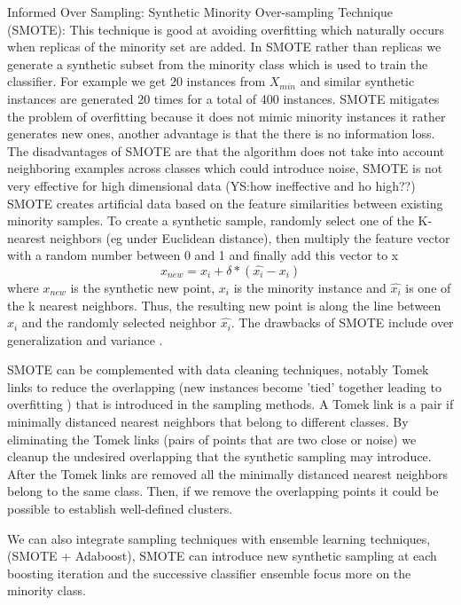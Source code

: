 \documentclass[11pt]{article}
\theoremstyle{definition}
\theoremstyle{remark}
\begin{document}
{Informed Over Sampling: Synthetic Minority Over-sampling Technique (SMOTE): This technique is good at avoiding overfitting which naturally occurs when replicas of the minority set are added. In SMOTE rather than replicas we generate a synthetic subset from the minority class which is used to train the classifier. For example we get 20 instances from $X_{min}$ and similar synthetic instances are generated 20 times for a total of 400 instances. SMOTE mitigates the problem of overfitting because it does not mimic minority instances it rather generates new ones, another advantage is that the there is no information loss.
The disadvantages of SMOTE are that the algorithm does not take into account neighboring examples across classes which could introduce noise, SMOTE is not very effective for high dimensional data (YS:how ineffective and ho high??)
SMOTE creates artificial data based on the feature similarities between existing minority samples. To create a synthetic sample, randomly select one of the K-nearest neighbors (eg under Euclidean distance), then multiply the feature vector with a random number between 0 and 1 and finally add this vector to x
\begin{equation}
x_{new} =  x_i + \delta * (\hat{x_i} - x_i)
\end{equation}
where $x_{new}$ is the synthetic new point, $x_i$ is the minority instance and $\hat{x_i}$ is one of the k nearest neighbors. Thus, the resulting new point is along the line between $x_i$ and the randomly selected neighbor $\hat{x_i}$. The drawbacks of SMOTE include over generalization and variance \cite{wang2004imbalanced}.

SMOTE can be complemented with data cleaning techniques, notably Tomek links \cite{tomek1976two} to reduce the overlapping (new instances become 'tied' together leading to overfitting \cite{mease2007boosted}) that is introduced in the sampling methods.
A Tomek link is a pair if minimally distanced nearest neighbors that belong to different classes. By eliminating the Tomek links (pairs of points that are two close or noise) we cleanup the undesired overlapping that the synthetic sampling may introduce. After the Tomek links are removed all the minimally distanced nearest neighbors belong to the same class. Then, if we remove the overlapping points it could be possible to establish well-defined clusters. 

We can also integrate sampling techniques with ensemble learning techniques,  (SMOTE + Adaboost), SMOTE can introduce new synthetic sampling at each boosting iteration and the successive classifier ensemble focus more on the minority class.


}
\end{document}
